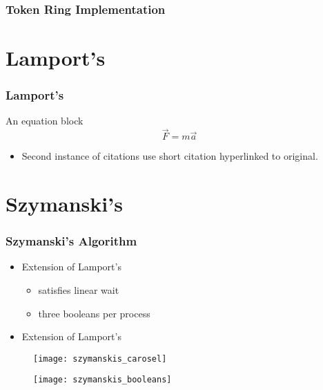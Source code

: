 \documentclass[t, pdftex]{beamer}
\begin{document}
\begin{frame}
	\frametitle{Token Ring Implementation}
	  \begin{multicols*}{3}
    
  \end{multicols*}
\end{frame}



\section{Lamport's}
\begin{frame}[c]
    \frametitle{Lamport's}
    \begin{block}{An equation block}
        \[ \vec{F} = m \vec{a} \]
    \end{block}
    \begin{itemize}
        \item Second instance of citations use short citation hyperlinked to original.
    \end{itemize}
\end{frame}

\section{Szymanski's}
\begin{frame}[c]
    \frametitle{Szymanski's Algorithm}
    \begin{itemize}
      \item Extension of Lamport's
        \begin{itemize}
          \item satisfies linear wait
          \item three booleans per process
        \end{itemize}
      \item Extension of Lamport's
    \end{itemize}
  \begin{figure}
    \centering
    \begin{minipage}{.5\textwidth}
      \centering
      \texttt{[image: szymanskis\_carosel]}
      \label{fig:szymanskis_carosel}
    \end{minipage}%
    \begin{minipage}{.5\textwidth}
      \centering
      \texttt{[image: szymanskis\_booleans]}
      \label{fig:szymanskis_booleans}
    \end{minipage}
  \end{figure}
\end{frame}
\end{document}
